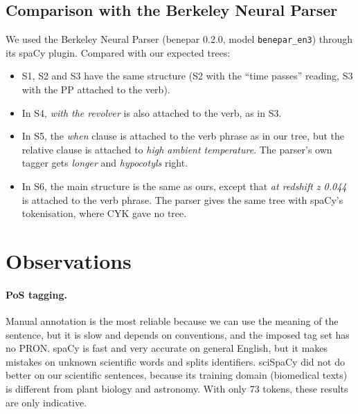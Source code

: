 \documentclass[11pt,a4paper]{article}
\begin{document}
\subsection{Comparison with the Berkeley Neural Parser}
We used the Berkeley Neural Parser (benepar 0.2.0, model \texttt{benepar\_en3}) through its spaCy plugin. Compared with our expected trees:
\begin{itemize}
  \item S1, S2 and S3 have the same structure (S2 with the ``time passes'' reading, S3 with the PP attached to the verb).
  \item In S4, \emph{with the revolver} is also attached to the verb, as in S3.
  \item In S5, the \emph{when} clause is attached to the verb phrase as in our tree, but the relative clause is attached to \emph{high ambient temperature}. The parser's own tagger gets \emph{longer} and \emph{hypocotyls} right.
  \item In S6, the main structure is the same as ours, except that \emph{at redshift z 0.044} is attached to the verb phrase. The parser gives the same tree with spaCy's tokenisation, where CYK gave no tree.
\end{itemize}

\section{Observations}

\paragraph{PoS tagging.} Manual annotation is the most reliable because we can use the meaning of the sentence, but it is slow and depends on conventions, and the imposed tag set has no PRON. spaCy is fast and very accurate on general English, but it makes mistakes on unknown scientific words and splits identifiers. sciSpaCy did not do better on our scientific sentences, because its training domain (biomedical texts) is different from plant biology and astronomy. With only 73 tokens, these results are only indicative.
\end{document}
